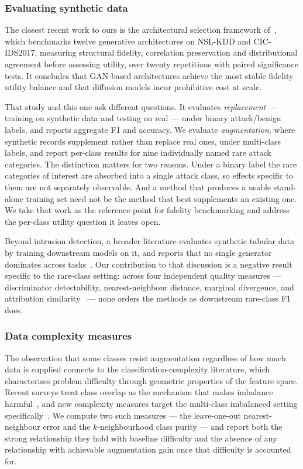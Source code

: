 \documentclass[11pt]{article}
\begin{document}
\subsubsection*{Evaluating synthetic data}

The closest recent work to ours is the architectural selection framework
of~\cite{architectural2026selection}, which benchmarks twelve generative
architectures on NSL-KDD and CIC-IDS2017, measuring structural fidelity, correlation
preservation and distributional agreement before assessing utility, over twenty
repetitions with paired significance tests. It concludes that GAN-based architectures
achieve the most stable fidelity--utility balance and that diffusion models incur
prohibitive cost at scale.

That study and this one ask different questions. It evaluates \emph{replacement} ---
training on synthetic data and testing on real --- under binary attack/benign labels,
and reports aggregate F1 and accuracy. We evaluate \emph{augmentation}, where
synthetic records supplement rather than replace real ones, under multi-class labels,
and report per-class results for nine individually named rare attack categories. The
distinction matters for two reasons. Under a binary label the rare categories of
interest are absorbed into a single attack class, so effects specific to them are not
separately observable. And a method that produces a usable stand-alone training set
need not be the method that best supplements an existing one. We take that work as
the reference point for fidelity benchmarking and address the per-class utility
question it leaves open.

Beyond intrusion detection, a broader literature evaluates synthetic tabular data by training downstream models on it, and reports that no single generator dominates across tasks~\cite{stoian2025survey,challagundla2025synthetic}. Our contribution to that discussion is a negative result specific to
the rare-class setting: across four independent quality measures --- discriminator
detectability, nearest-neighbour distance, marginal divergence, and attribution
similarity~\cite{lundberg2017unified} --- none orders the methods as downstream
rare-class F1 does.

\subsubsection*{Data complexity measures}

The observation that some classes resist augmentation regardless of how much data is
supplied connects to the classification-complexity literature, which characterises
problem difficulty through geometric properties of the feature space. Recent surveys treat class overlap as the mechanism that makes imbalance harmful~\cite{kumar2024overlap}, and new complexity measures target the multi-class imbalanced setting specifically~\cite{han2024complexity}. We compute two such measures --- the leave-one-out
nearest-neighbour error and the $k$-neighbourhood class purity --- and report both the
strong relationship they hold with baseline difficulty and the absence of any
relationship with achievable augmentation gain once that difficulty is accounted for.
\end{document}
